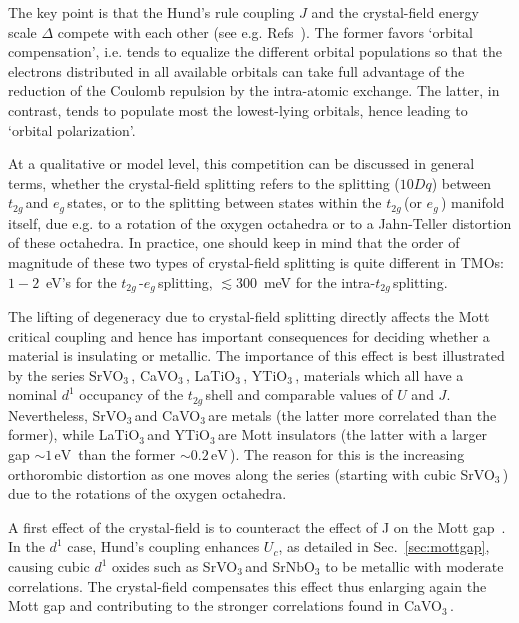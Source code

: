 \documentclass[]{ar2e-changed}%
\def\eV{\,\mbox{eV}\,}
\def\ttg{$t_{2g}\,$}
\def\eg{$e_{g}\,$}
\def\GFO{GdFeO$_3$\,}
\def\SVO{SrVO$_3$\,}
\def\CVO{CaVO$_3$\,}
\def\LTO{LaTiO$_3$\,}
\def\YTO{YTiO$_3$\,}
\begin{document}
The key point is that the Hund's rule coupling $J$ and the crystal-field energy scale $\Delta$ 
compete with each other (see e.g. Refs~\cite{OkamotoMillis_CSRO,Lechermann_BaVS3_proceeding}). 
%
The former favors `orbital compensation', i.e. tends to equalize the different orbital populations so that 
the electrons distributed in all available orbitals can take full advantage of the reduction of the Coulomb 
repulsion by the intra-atomic exchange. 
The latter, in contrast, tends to populate most the lowest-lying orbitals, hence leading to `orbital polarization'. 

At a qualitative or model level, this competition can be discussed in general terms, whether the 
crystal-field splitting refers to the splitting ($10 Dq$) between \ttg and \eg states, or to the splitting between states 
within the \ttg (or \eg) manifold itself, due e.g. to a rotation of the oxygen octahedra or to a Jahn-Teller distortion of these 
octahedra.  
In practice, one should keep in mind that the order of magnitude of these two types of crystal-field 
splitting is quite different in TMOs: $1-2$~eV's for the \ttg-\eg splitting, $\lesssim 300$~meV for the intra-\ttg splitting. 

The lifting of degeneracy due to crystal-field splitting directly
affects the Mott critical coupling and hence has important
consequences for deciding whether a material is insulating or
metallic. 
The importance of this effect is best
illustrated~\cite{Pavarini_dist_d1_oxides,pavarini_njp_2005} by the
series \SVO, \CVO, \LTO, \YTO, materials which all have a nominal
$d^1$ occupancy of the \ttg shell and comparable values of $U$ and
$J$. Nevertheless, \SVO and \CVO are metals (the latter more
correlated than the former), while \LTO and \YTO are Mott insulators
(the latter with a larger gap $\sim 1\eV$ than the former $\sim
0.2\eV$).  The reason for this is the increasing orthorombic
distortion as one moves along the series (starting with cubic \SVO)
due to the 
rotations of the oxygen octahedra. 

A first effect of the crystal-field is to counteract the
effect of J on the Mott gap~\cite{demedici_MottHund}. 
In the $d^1$ case, Hund's coupling enhances $U_c$, as detailed in Sec.~\ref{sec:mottgap},
causing cubic $d^1$ oxides such as \SVO and SrNbO$_3$ to be metallic with moderate correlations. 
%
The crystal-field compensates this effect thus enlarging again the Mott gap and
contributing to the stronger correlations found in \CVO.
\end{document}
